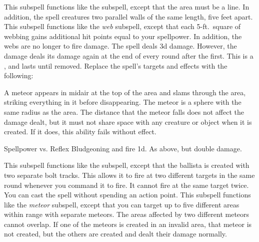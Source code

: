 This subspell functions like the  subspell, except that the area must be a line.
In addition, the spell creatures two parallel walls of the same length, five feet apart.
This subspell functions like the \textit{web} subspell, except that each 5-ft.\ square of webbing gains additional hit points equal to your spellpower.
In addition, the webs are no longer  to fire damage.
The spell deals \minus3d damage.
However, the damage deals its damage again at the end of every round after the first.
This is a , and lasts until removed.
Replace the spell's targets and effects with the following:
\begin{spellcontent}
\begin{augmenttargetinginfo}
\end{augmenttargetinginfo}
\begin{augmenteffects}
\spelleffect
A meteor appears in midair at the top of the area and slams through the area, striking everything in it before disappearing.
The meteor is a sphere with the same radius as the area.
The distance that the meteor falls does not affect the damage dealt, but it must not share space with any creature or object when it is created.
If it does, this ability fails without effect.
\begin{spellattack}{Spellpower vs. Reflex}
\spellsuccess Bludgeoning and fire  \minus1d.
\spellcritical As above, but double damage.
\end{spellattack}
\end{augmenteffects}
\end{spellcontent}
This subspell functions like the  subspell, except that the ballista is created with two separate bolt tracks.
This allows it to fire at two different targets in the same round whenever you command it to fire.
It cannot fire at the same target twice.
You can cast the spell without spending an action point.
This subspell functions like the \textit{meteor} subspell, except that you can target up to five different areas within range with separate meteors.
The areas affected by two different meteors cannot overlap.
If one of the meteors is created in an invalid area, that meteor is not created, but the others are created and dealt their damage normally.
